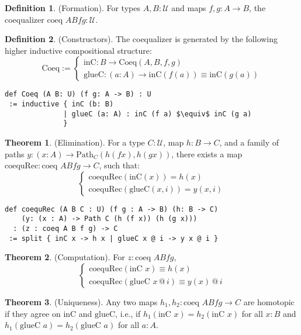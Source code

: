 \documentclass{article}
\theoremstyle{definition}
\newtheorem{theorem}{Theorem}
\newtheorem{definition}{Definition}
\begin{document}
\begin{definition} (Formation).
For types \( A, B : \mathcal{U} \) and maps \( f, g : A \to B \),
the coequalizer \( \text{coeq } A B f g : \mathcal{U} \).
\end{definition}

\begin{definition} (Constructors).
The coequalizer is generated by the following higher inductive compositional structure:
\[
\text{Coeq} :=
\begin{cases}
\text{inC} : B \to \text{Coeq}(A,B,f,g) \\
\text{glueC} : (a : A) \to \text{inC}(f(a)) \equiv \text{inC}(g(a))
\end{cases}
\]
\begin{lstlisting}[mathescape=true]
def Coeq (A B: U) (f g: A -> B) : U
 := inductive { inC (b: B)
              | glueC (a: A) : inC (f a) $\equiv$ inC (g a)
              }
\end{lstlisting}
\end{definition}

\begin{theorem} (Elimination).
For a type \( C : \mathcal{U} \), map \( h : B \to C \), and a family of paths \( y : (x : A) \to \text{Path}_C (h (f x), h (g x)) \), there exists a map \( \text{coequRec} : \text{coeq } A B f g \to C \), such that:
\[
\begin{cases}
\text{coequRec}(\text{inC}(x)) = h(x) \\
\text{coequRec}(\text{glueC}(x,i)) = y(x,i)
\end{cases}
\]
\begin{lstlisting}
def coequRec (A B C : U) (f g : A -> B) (h: B -> C)
    (y: (x : A) -> Path C (h (f x)) (h (g x)))
  : (z : coeq A B f g) -> C
 := split { inC x -> h x | glueC x @ i -> y x @ i }
\end{lstlisting}
\end{theorem}

\begin{theorem} (Computation).
For \( z : \text{coeq } A B f g \),
\[
\begin{cases}
\text{coequRec}(\text{inC } x) \equiv h(x) \\
\text{coequRec}(\text{glueC } x \, @ \, i) \equiv y(x) \, @ \, i
\end{cases}
\]
\end{theorem}

\begin{theorem} (Uniqueness).
Any two maps \( h_1, h_2 : \text{coeq } A B f g \to C \) are homotopic
if they agree on \( \text{inC} \) and \( \text{glueC} \), i.e.,
if \( h_1(\text{inC } x) = h_2(\text{inC } x) \) for
all \( x : B \) and \( h_1(\text{glueC } a) = h_2(\text{glueC } a) \) for all \( a : A \).
\end{theorem}
\end{document}

